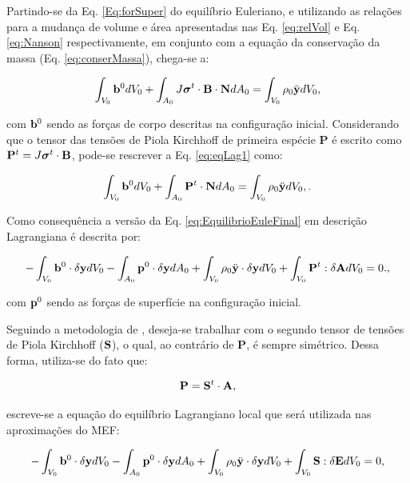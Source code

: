 \documentclass[tese_patricia]{subfiles}
\begin{document}
Partindo-se da Eq. \eqref{Eq:forSuper} do equilíbrio Euleriano, e utilizando as relações para a mudança de volume e área apresentadas nas Eq. \eqref{eq:relVol} e  Eq. \eqref{eq:Nanson} respectivamente, em conjunto com a equação da conservação da massa (Eq. \eqref{eq:conserMassa}), chega-se a:

\begin{align}
\int_{V_{0}} \mathbf{b}^0  dV_{0} + \int_{A_{0}} J \boldsymbol{\sigma}^{t} \cdot \mathbf{B} \cdot \mathbf{N} dA_{0} = \int_{V_{0}} \rho_{0} \ddot{\mathbf{y}} dV_{0}, \label{eq:eqLag1}
\end{align}

\noindent com $\mathbf{b}^0$ sendo as forças de corpo descritas na configuração inicial. Considerando que o tensor das tensões de Piola Kirchhoff de primeira espécie $\mathbf{P}$ é escrito como $\mathbf{P}^{t} = J \boldsymbol{\sigma}^{t} \cdot \mathbf{B}$, pode-se rescrever a Eq. \eqref{eq:eqLag1} como:

\begin{align}
\int_{V_{0}} \mathbf{b}^0 dV_{0} + \int_{A_{0}} \mathbf{P}^{t} \cdot \mathbf{N} dA_{0} = \int_{V_{0}} \rho_{0} \ddot{\mathbf{y}} dV_{0}, \label{eq:eqLag2}.
\end{align}

Como consequência a versão da Eq. \eqref{eq:EquilibrioEuleFinal} em descrição Lagrangiana é descrita por:

\begin{align}
-\int_{V_{0}}  \mathbf{b}^0 \cdot \delta\mathbf{y} dV_{0} - \int_{A_{0}} \mathbf{p}^{0} \cdot \delta\mathbf{y} dA_{0} + \int_{V_{0}} \rho_{0} \ddot{\mathbf{y}} \cdot \delta\mathbf{y} dV_{0} + \int_{V_{0}} \mathbf{P}^{t} : \delta\mathbf{A} dV_{0} = 0. \label{eq:eqLag3},
\end{align}

\noindent com $\mathbf{p}^{0}$ sendo as forças de superfície na configuração inicial. 

Seguindo a metodologia de , deseja-se trabalhar com o segundo tensor de tensões de Piola Kirchhoff ($\mathbf{S}$), o qual, ao contrário de $\mathbf{P}$, é sempre simétrico. Dessa forma, utiliza-se do fato que:

\begin{align}
\mathbf{P} = \mathbf{S}^{t} \cdot \mathbf{A},
\end{align}

\noindent escreve-se a equação do equilíbrio Lagrangiano local que será utilizada nas aproximações do MEF:

\begin{align}
-\int_{V_{0}}\mathbf{b}^0 \cdot \delta\mathbf{y} dV_{0} - \int_{A_{0}} \mathbf{p}^{0} \cdot \delta\mathbf{y} dA_{0} + \int_{V_{0}} \rho_{0} \ddot{\mathbf{y}} \cdot \delta\mathbf{y} dV_{0} + \int_{V_{0}} \mathbf{S} : \delta\mathbf{E} dV_{0} = 0,\label{eq:eqLagFinal}
\end{align}
\end{document}
